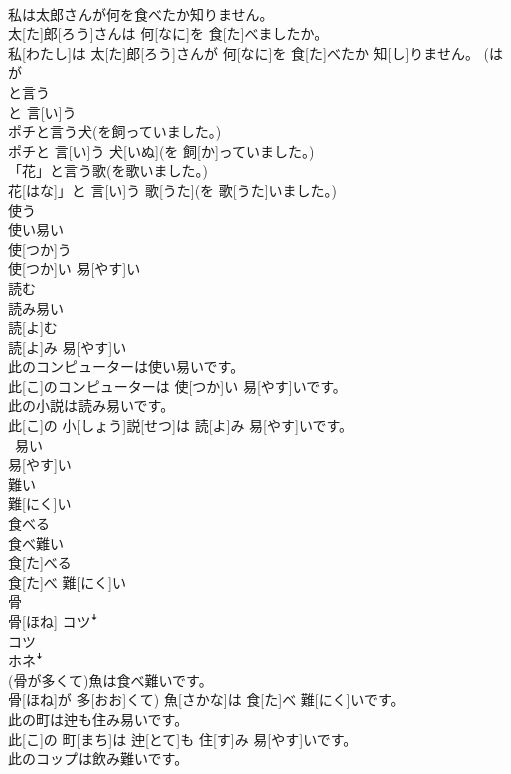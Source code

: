 \documentclass[8pt]{extreport}
\begin{document}
\begin{CJK}{UTF8}{min}
\\	私は太郎さんが何を食べたか知りません。	
\\	太[た]郎[ろう]さんは 何[なに]を 食[た]べましたか。 
\\	私[わたし]は 太[た]郎[ろう]さんが 何[なに]を 食[た]べたか 知[し]りません。 (は 
\\	が 
\\	と言う 
\\	と 言[い]う 
\\	ポチと言う犬(を飼っていました。)	
\\	ポチと 言[い]う 犬[いぬ](を 飼[か]っていました。)
\\	「花」と言う歌(を歌いました。)	
\\	花[はな]」と 言[い]う 歌[うた](を 歌[うた]いました。)
\\	使う 
\\	使い易い	
\\	使[つか]う 
\\	使[つか]い 易[やす]い
\\	読む 
\\	読み易い	
\\	読[よ]む 
\\	読[よ]み 易[やす]い
\\	此のコンピューターは使い易いです。	
\\	此[こ]のコンピューターは 使[つか]い 易[やす]いです。
\\	此の小説は読み易いです。	
\\	此[こ]の 小[しょう]説[せつ]は 読[よ]み 易[やす]いです。
\\	~易い	
\\	易[やす]い
\\	難い	
\\	難[にく]い
\\	食べる 
\\	食べ難い	
\\	食[た]べる 
\\	食[た]べ 難[にく]い
\\	骨	
\\	骨[ほね]	コツꜜ 
\\	コツ 
\\	ホネꜜ
\\	(骨が多くて)魚は食べ難いです。	
\\	骨[ほね]が 多[おお]くて) 魚[さかな]は 食[た]べ 難[にく]いです。
\\	此の町は迚も住み易いです。	
\\	此[こ]の 町[まち]は 迚[とて]も 住[す]み 易[やす]いです。
\\	此のコップは飲み難いです。	

\end{CJK}
\end{document}
